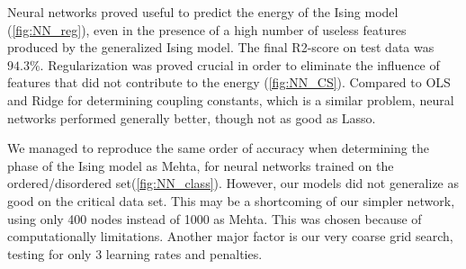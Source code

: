 Neural networks proved useful to predict the energy of the Ising model (\autoref{fig:NN_reg}), even in the presence of a high number of useless features produced by the generalized Ising model. The final R2-score on test data was $94.3\%$. Regularization was proved crucial in order to eliminate the influence of features that did not contribute to the energy (\autoref{fig:NN_CS}). Compared to OLS and Ridge for determining coupling constants, which is a similar problem, neural networks performed generally better, though not as good as Lasso. 

We managed to reproduce the same order of accuracy when determining the phase of the Ising model as Mehta, for neural networks trained on the ordered/disordered set(\autoref{fig:NN_class}). However, our models did not generalize as good on the critical data set. This may be a shortcoming of our simpler network, using only 400 nodes instead of 1000 as Mehta. This was chosen because of computationally limitations. Another major factor is our very coarse grid search, testing for only 3 learning rates and penalties. 